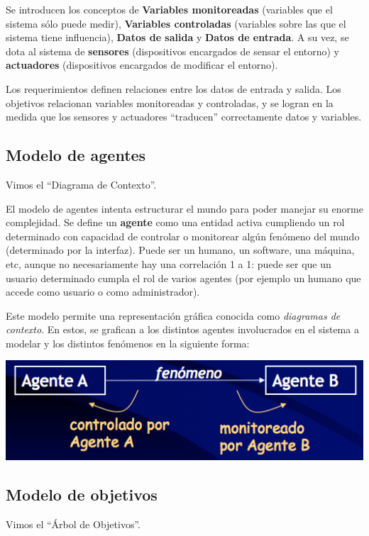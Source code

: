 \documentclass[]{article}
\begin{document}
Se introducen los conceptos de \textbf{Variables monitoreadas} (variables que el sistema sólo puede medir), \textbf{Variables controladas} (variables sobre las que el sistema tiene influencia), \textbf{Datos de salida} y \textbf{Datos de entrada}. A su vez, se dota al sistema de \textbf{sensores} (dispositivos encargados de sensar el entorno) y \textbf{actuadores} (dispositivos encargados de modificar el entorno).

Los requerimientos definen relaciones entre los datos de entrada y salida. Los objetivos relacionan variables monitoreadas y controladas, y se logran en la medida que los sensores y actuadores ``traducen'' correctamente datos y variables.

\subsection{Modelo de agentes}
Vimos el ``Diagrama de Contexto''.

El modelo de agentes intenta estructurar el mundo para poder manejar su enorme complejidad. Se define un \textbf{agente} como una entidad activa cumpliendo un rol determinado con capacidad de controlar o monitorear algún fenómeno del mundo (determinado por la interfaz). Puede ser un humano, un software, una máquina, etc, aunque no necesariamente hay una correlación 1 a 1: puede ser que un usuario determinado cumpla el rol de varios agentes (por ejemplo un humano que accede como usuario o como administrador).

Este modelo permite una representación gráfica conocida como \textit{diagramas de contexto}. En estos, se grafican a los distintos agentes involucrados en el sistema a modelar y los distintos fenómenos en la siguiente forma:

\begin{center}
	\includegraphics[scale = 0.70]{Contexto.png}
\end{center}

\subsection{Modelo de objetivos}
Vimos el ``Árbol de Objetivos''.
\end{document}
